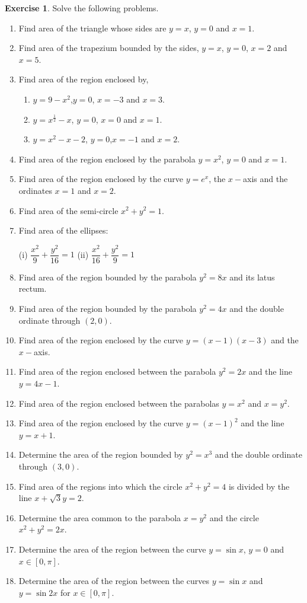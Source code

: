 \documentclass[../../main.tex]{subfiles}
\theoremstyle{definition}
\newtheorem{exercise}{Exercise}[section]
\begin{document}
\begin{exercise}
Solve the following problems.
\begin{enumerate}
    \item Find area of the triangle whose sides are $y=x$, $y=0$ and $x=1$.
    \item Find area of the trapezium bounded by the sides, $y=x$, $y=0$, $x=2$ and $x=5$.
    \item Find area of the region enclosed by,
    \begin{enumerate}[label=(\alph*)]
        \item $y=9-x^2$,$y=0$, $x=-3$ and $x=3$.
        \item $y=x^{\frac{1}{2}}-x$, $y=0$, $x=0$ and $x=1$.
        \item $y=x^2-x-2$, $y=0$,$x=-1$ and $x=2$.
    \end{enumerate}

    \item Find area of the region enclosed by the parabola $y=x^2$, $y=0$ and $x=1$.
    \item Find area of the region enclosed by the curve $y=e^x$, the $x-$axis and the ordinates $x=1$ and $x=2$.
    \item Find area of the semi-circle $x^2+y^2=1$.
    \item Find area of the ellipses:
    
    (i) $\dfrac{x^2}{9}+\dfrac{y^2}{16}=1$ \qquad  (ii) $\dfrac{x^2}{16}+\dfrac{y^2}{9}=1$
    
    \item Find area of the region bounded by the parabola $y^2=8x$ and its latus rectum.
    \item Find area of the region bounded by the parabola $y^2=4x$ and the double ordinate through $(2,0)$.
    \item Find area of the region enclosed by the curve $y=(x-1)(x-3)$ and the $x-$axis.
    \item Find area of the region enclosed between the parabola $y^2=2x$ and the line $y=4x-1$.
    \item Find area of the region enclosed between the parabolas $y=x^2$ and $x=y^2$.
    \item Find area of the region enclosed by the curve $y=(x-1)^2$ and the line $y=x+1$.
    \item Determine the area of the region bounded by $y^2=x^3$ and the double ordinate through $(3,0)$.
    \item Find area of the regions into which the circle $x^2+y^2=4$ is divided by the line $x+\sqrt{3}y=2$.
    \item Determine the area common to the parabola $x=y^2$ and the circle $x^2+y^2=2x$.
    \item Determine the area of the region between the curve $y=\sin x$, $y=0$ and $x\in[0,\pi]$.
    \item Determine the area of the region between the curves $y=\sin x$ and $y=\sin 2x$ for $x\in[0,\pi]$.
\end{enumerate}    
\end{exercise}
\end{document}
